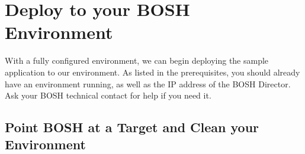 \section{Deploy to your BOSH Environment}
\label{deploytoyourboshenvironment}

With a fully configured environment, we can begin deploying the sample application to our environment. As listed in the prerequisites, you should already have an environment running, as well as the IP address of the BOSH Director. Ask your BOSH technical contact for help if you need it.

\subsection{Point BOSH at a Target and Clean your Environment}
\label{pointboshatatargetandcleanyourenvironment}

